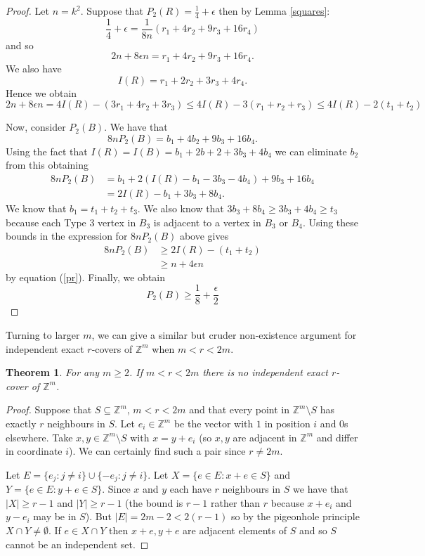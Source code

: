 \documentclass[12pt,a4paper]{article}
\newcommand{\Z}{\mathbb Z}
\newcommand{\eps}{\epsilon}
\newtheorem{thm}{Theorem}
\begin{document}
\begin{proof}
Let $n=k^2$. Suppose that $P_2(R)=\frac{1}{4}+\eps$ then by Lemma \ref{squares}:
\[
\frac{1}{4}+\eps=\frac{1}{8n}\left(r_1+4r_2+9r_3+16r_4\right)
\]
and so
\[
2n+8\eps n=r_1+4r_2+9r_3+16r_4.
\]
We also have 
\[
I(R)=r_1+2r_2+3r_3+4r_4.
\]
Hence we obtain
\begin{equation}\label{pr}
2n+8\eps n=4I(R)-(3r_1+4r_2+3r_3)\leq 4I(R)-3(r_1+r_2+r_3)\leq 4I(R)-2(t_1+t_2)
\end{equation}

Now, consider $P_2(B)$. We have that
\[
8nP_2(B)=b_1+4b_2+9b_3+16b_4.
\]
Using the fact that $I(R)=I(B)=b_1+2b+2+3b_3+4b_4$ we can eliminate $b_2$ from this obtaining 
\begin{align*}
8nP_2(B)&=b_1+2\left(I(R)-b_1-3b_3-4b_4\right)+9b_3+16b_4\\
&=2I(R)-b_1+3b_3+8b_4.
\end{align*}
We know that $b_1=t_1+t_2+t_3$. We also know that $3b_3+8b_4\geq 3b_3+4b_4\geq t_3$ because each Type $3$ vertex in $B_3$ is adjacent to a vertex in $B_3$ or $B_4$. Using these bounds in the expression for $8nP_2(B)$ above gives
\begin{align*}
8nP_2(B)&\geq 2I(R)-(t_1+t_2)\\
&\geq n +4\eps n
\end{align*}
by equation (\ref{pr}). Finally, we obtain
\[
P_2(B)\geq\frac{1}{8}+\frac{\eps}{2}
\]
\end{proof}

Turning to larger $m$, we can give a similar but cruder non-existence argument for independent exact $r$-covers of $\Z^m$ when $m<r<2m$. 

\begin{thm}\label{no-exact-cover:thm}
For any $m\geq 2$. If $m<r<2m$ there is no independent exact $r$-cover of $\Z^m$.
\end{thm}

\begin{proof}
Suppose that $S\subseteq\Z^m$, $m<r<2m$ and that every point in $\Z^m\setminus S$ has exactly $r$ neighbours in $S$. Let $e_i\in\Z^m$ be the vector with $1$ in position $i$ and $0$s elsewhere. Take $x,y\in\Z^m\setminus S$ with $x=y+e_i$ (so $x,y$ are adjacent in $\Z^m$ and differ in coordinate $i$). We can certainly find such a pair since $r\not=2m$. 

Let $E=\{e_j: j\not=i\}\cup\{-e_j : j\not=i\}$. Let $X=\{e\in E :x+e\in S\}$ and $Y=\{e\in E :y+e\in S\}$. Since $x$ and $y$ each have $r$ neighbours in $S$ we have that $|X|\geq r-1$ and $|Y|\geq r-1$ (the bound is $r-1$ rather than $r$ because $x+e_i$ and $y-e_i$ may be in $S$). But $|E|=2m-2<2(r-1)$ so by the pigeonhole principle $X\cap Y\not=\emptyset$. If $e\in X\cap Y$ then $x+e,y+e$ are adjacent elements of $S$ and so $S$ cannot be an independent set.  
\end{proof}
\end{document}
